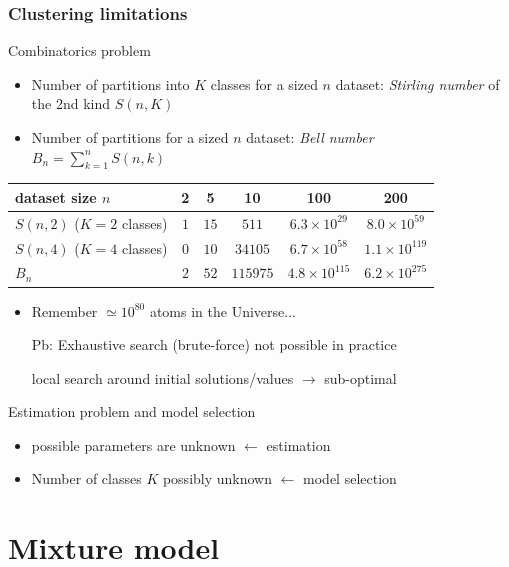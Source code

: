 \documentclass[compress, smaller, serif, 9pt]{beamer}
\newcommand{\doigtr}{\alert{\noindent \Pisymbol{pzd}{43}}}
\begin{document}
\begin{frame}
  \frametitle{Clustering limitations}
  \begin{block}{Combinatorics problem}
  \begin{itemize}
     \item Number of partitions into $K$ classes for a  sized $n$ dataset: {\em Stirling number} of the 2nd kind $S(n,K)$
     \item Number of partitions for a  sized $n$ dataset: {\em Bell number} $B_n= \sum_{k=1}^n S(n,k)$
   \end{itemize}
   {\small
  \begin{tabular}{l|ccccc}
  dataset size $n$ & 2 & 5 & 10 & 100 & 200 \\
  \hline
  $S(n,2)$ ($K=2$ classes) & $1$ & $15$ & $511$ & $6.3\times 10^{29}$ & $8.0\times 10^{59}$ \\
  $S(n,4)$ ($K=4$ classes) & $0$ & $10$ & $34105$ &  $6.7 \times 10^{58}$ & $1.1 \times 10^{119}$ \\
  $B_n$ & $2$ & $52$ & $115975$ & $4.8 \times 10^{115}$ & $6.2 \times 10^{275}$\\
  \hline
\end{tabular}
}

      \begin{itemize}
     \item Remember $\simeq 10^{80}$ atoms in the Universe...
     \item[Pb:]  Exhaustive search (brute-force) not possible in practice
      \item[\doigtr] \alert{local search} around initial  solutions/values $\rightarrow$ sub-optimal
  \end{itemize}
  \end{block}

  \begin{block}{Estimation problem and model selection}
      \begin{itemize}
     \item possible parameters are unknown $\leftarrow$ estimation
     \item Number of classes $K$ possibly unknown $\leftarrow$ model selection
     \end{itemize}
   \end{block}
\end{frame}

\section{Mixture model}
\end{document}
